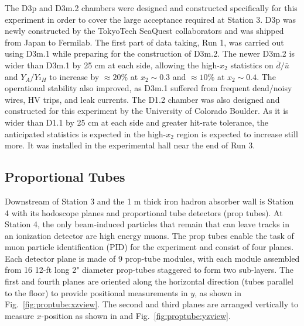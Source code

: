 The D3p and D3m.2 chambers were designed and constructed specifically for this experiment in order to cover the large acceptance required at Station 3. D3p was newly constructed by the TokyoTech SeaQuest collaborators and was shipped from Japan to Fermilab. The first part of data taking, Run 1, was carried out using D3m.1 while preparing for the construction of D3m.2. The newer D3m.2 is wider than D3m.1 by 25 cm at each side, allowing the high-$x_2$ statistics on $\bar{d}/\bar{u}$ and $Y_A / Y_{^2H}$ to increase by $\approx 20\%$ at $x_2 \sim 0.3$ and $\approx 10\%$ at $x_2 \sim 0.4$. The operational stability also improved, as D3m.1 suffered from frequent dead/noisy wires, HV trips, and leak currents. The D1.2 chamber was also designed and constructed for this experiment by the University of Colorado Boulder. As it is wider than D1.1 by 25 cm at each side and greater hit-rate tolerance, the anticipated statistics is expected in the high-$x_2$ region is expected to increase still more. It was installed in the experimental hall near the end of Run 3.

\subsection{Proportional Tubes}

Downstream of Station 3 and the 1 m thick iron hadron absorber wall is Station 4 with its hodoscope planes and proportional tube  detectors (prop tubes). At Station 4, the only beam-induced particles that remain that can leave tracks in an ionization detector are high energy muons. The prop tubes enable the task of muon particle identification (PID) for the experiment and consist of four planes. Each detector plane is made of 9 prop-tube modules, with each module assembled from 16 12-ft long 2" diameter prop-tubes staggered to form two sub-layers. The first and fourth planes are oriented along the horizontal direction (tubes parallel to the floor) to provide positional measurements in $y$, as shown in Fig.~\ref{fig:proptube:xzview}. The second and third planes are arranged vertically to measure $x$-position as shown in and Fig.~\ref{fig:proptube:yzview}.

